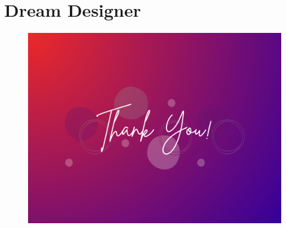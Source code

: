 \documentclass[t,xcolor={dvipsnames}]{beamer} %
\begin{document}
\section{Dream Designer}

\begin{frame}[plain]
  \begin{figure}[H]
    \includegraphics[width=\textwidth, height=0.95\textheight]{data/thank_you.png}
  \end{figure}

\end{frame}
\end{document}
